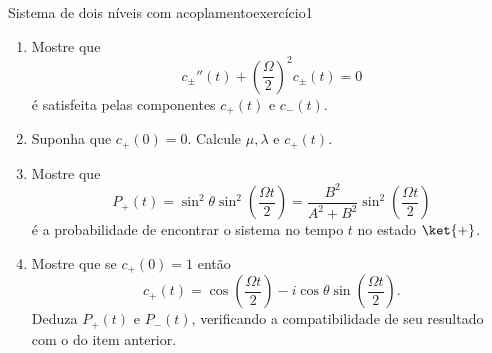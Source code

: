\begin{exercício}{Sistema de dois níveis com acoplamento}{exercício1}
\begin{enumerate}[label=(\alph*)]
            onde \(\hbar \Omega\) é a diferença entre os dois níveis de energia.
        \item Mostre que
            \begin{equation*}
                c_\pm''(t) + \left(\frac{\Omega}{2}\right)^2 c_{\pm}(t) = 0
            \end{equation*}
            é satisfeita pelas componentes \(c_+(t)\) e \(c_-(t)\).
        \item Suponha que \(c_+(0) = 0\). Calcule \(\mu, \lambda\) e \(c_+(t)\).
        \item Mostre que
            \begin{equation*}
                P_+(t) = \sin^2\theta \sin^2\left(\frac{\Omega t}{2}\right) = \frac{B^2}{A^2 + B^2}\sin^2\left(\frac{\Omega t}{2}\right)
            \end{equation*}
            é a probabilidade de encontrar o sistema no tempo \(t\) no estado \(\ket{+}\).
        \item Mostre que se \(c_+(0) = 1\) então
            \begin{equation*}
                c_+(t) = \cos\left(\frac{\Omega t}{2}\right) - i \cos\theta \sin\left(\frac{\Omega t}{2}\right).
            \end{equation*}
            Deduza \(P_+(t)\) e \(P_-(t)\), verificando a compatibilidade de seu resultado com o do item anterior.
    \end{enumerate}
\end{exercício}
